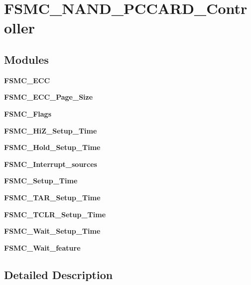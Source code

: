 \section{F\+S\+M\+C\+\_\+\+N\+A\+N\+D\+\_\+\+P\+C\+C\+A\+R\+D\+\_\+\+Controller}
\label{group__FSMC__NAND__PCCARD__Controller}
\subsection*{Modules}
\begin{DoxyCompactItemize}
\item 
\textbf{ F\+S\+M\+C\+\_\+\+E\+CC}
\item 
\textbf{ F\+S\+M\+C\+\_\+\+E\+C\+C\+\_\+\+Page\+\_\+\+Size}
\item 
\textbf{ F\+S\+M\+C\+\_\+\+Flags}
\item 
\textbf{ F\+S\+M\+C\+\_\+\+Hi\+Z\+\_\+\+Setup\+\_\+\+Time}
\item 
\textbf{ F\+S\+M\+C\+\_\+\+Hold\+\_\+\+Setup\+\_\+\+Time}
\item 
\textbf{ F\+S\+M\+C\+\_\+\+Interrupt\+\_\+sources}
\item 
\textbf{ F\+S\+M\+C\+\_\+\+Setup\+\_\+\+Time}
\item 
\textbf{ F\+S\+M\+C\+\_\+\+T\+A\+R\+\_\+\+Setup\+\_\+\+Time}
\item 
\textbf{ F\+S\+M\+C\+\_\+\+T\+C\+L\+R\+\_\+\+Setup\+\_\+\+Time}
\item 
\textbf{ F\+S\+M\+C\+\_\+\+Wait\+\_\+\+Setup\+\_\+\+Time}
\item 
\textbf{ F\+S\+M\+C\+\_\+\+Wait\+\_\+feature}
\end{DoxyCompactItemize}


\subsection{Detailed Description}
